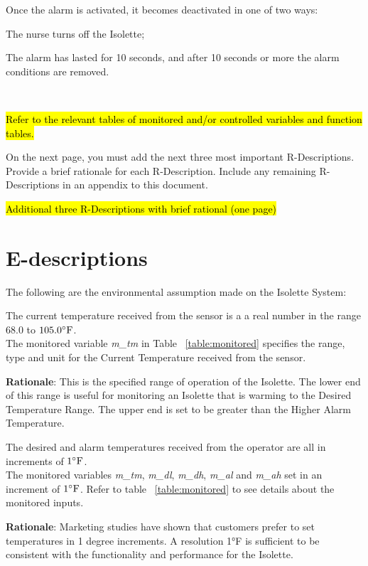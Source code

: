 \documentclass[fontsize=12pt,paper=letter,twoside]{scrartcl}
\begin{document}
\rdescription
{Once the alarm is activated, it becomes deactivated in one of two ways:
\begin{mylist}
\item The nurse turns off the Isolette;
\item The alarm has lasted for 10 seconds, and after 10 seconds or more the alarm conditions are removed.
\end{mylist}~\\}
{\hl{Refer to the relevant tables of monitored and/or controlled variables and function tables.}}
\label{R4}


On the next page, you must add the next three most important R-Descriptions. Provide a brief rationale for each R-Description. Include any remaining R-Descriptions in an appendix to this document. 

\newpage
\hl{Additional three R-Descriptions with brief rational (one page)}

\newpage
\section{E-descriptions}

The following are the environmental assumption made on the Isolette System:

\edescription
{The current temperature received from the sensor is a a real number in the range $68.0$ to $105.0 ^{\circ}\mathrm{F}$.\\}
{The monitored variable \emph{m\_tm} in Table ~\ref{table:monitored} specifies the range, type and unit for the Current Temperature received from the sensor.}
\label{E1}

\smallskip
\noindent \textbf{Rationale}: This is the specified range of operation of the Isolette. The lower end of this range is useful for monitoring an Isolette that is warming to the Desired Temperature Range. The upper end is set to be greater than the Higher Alarm Temperature.

\edescription
{The desired and alarm temperatures received from the operator are all in increments of $1 ^{\circ}\mathrm{F}$.\\}
{The monitored variables \emph{m\_tm}, \emph{m\_dl}, \emph{m\_dh}, \emph{m\_al} and \emph{m\_ah} set in an increment of $1 ^{\circ}\mathrm{F}$. Refer to table ~\ref{table:monitored} to see details about the monitored inputs.}
\label{E2}

\smallskip
\noindent \textbf{Rationale}: Marketing studies have shown that customers prefer to set temperatures in 1 degree increments. A resolution 1°F is sufficient to be consistent with the functionality and performance for the Isolette.
\end{document}
